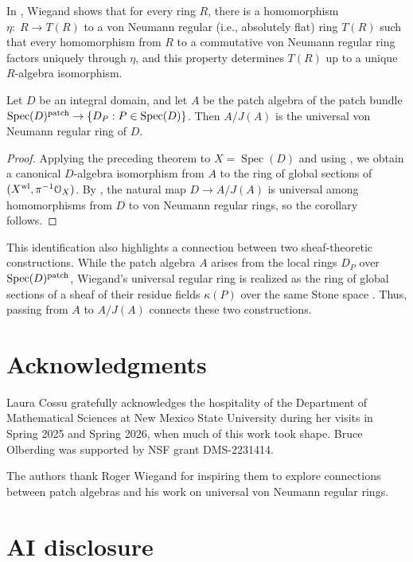 \documentclass[11pt]{amsart}
\def\O{{\mathcal{O}}}
\begin{document}
In \cite{Wiegand1971}, Wiegand shows that for every  ring $R$, there is a homomorphism $\eta\colon\; R\to T(R)$ to a von Neumann regular (i.e., absolutely flat) ring $T(R)$ such that every homomorphism from $R$ to a commutative von Neumann regular ring factors uniquely through $\eta$, and this property determines $T(R)$ up to a unique $R$-algebra isomorphism.

\begin{corollary} Let $D$ be an integral domain, and let $A$ be the patch algebra of the patch bundle $\mbox{\rm Spec}(D)^{\rm patch} \rightarrow \{D_P:P \in \mbox{\rm Spec}(D)\}$.  Then $A/J(A)$ is the universal von Neumann regular ring of $D$.
\end{corollary}

\begin{proof} Applying the preceding theorem to $X=\operatorname{Spec}(D)$ and using \cite[Lemma~2.2.4]{BhattScholze}, we obtain a canonical $D$-algebra isomorphism from $A$ to the ring of global sections of $(X^{\rm wl},\pi^{-1}\O_X)$. By \cite[Example~2.2.5]{BhattScholze}, the natural map $D\rightarrow A/J(A)$ is universal among homomorphisms from $D$ to  von Neumann regular rings, so  the corollary follows.
\end{proof}

This identification also highlights a connection between two sheaf-theoretic constructions. While the patch algebra $A$ arises from the local rings $D_P$ over $\mbox{\rm Spec}(D)^{\rm patch}$, Wiegand's universal regular ring is realized as the ring of global sections of a sheaf of their residue fields $\kappa(P)$ over the same Stone space \cite[Section~1]{Wiegand1971}. Thus, passing from $A$ to $A/J(A)$ connects these two constructions.


\section*{Acknowledgments}

Laura Cossu gratefully acknowledges the hospitality of the Department of Mathematical Sciences at New Mexico State University during her visits in Spring 2025 and Spring 2026, when much of this work took shape.
Bruce Olberding was supported by NSF grant DMS-2231414.

The authors thank Roger Wiegand for inspiring them to explore connections between patch algebras and his work on universal von Neumann regular rings.
\section*{AI disclosure}
\end{document}
